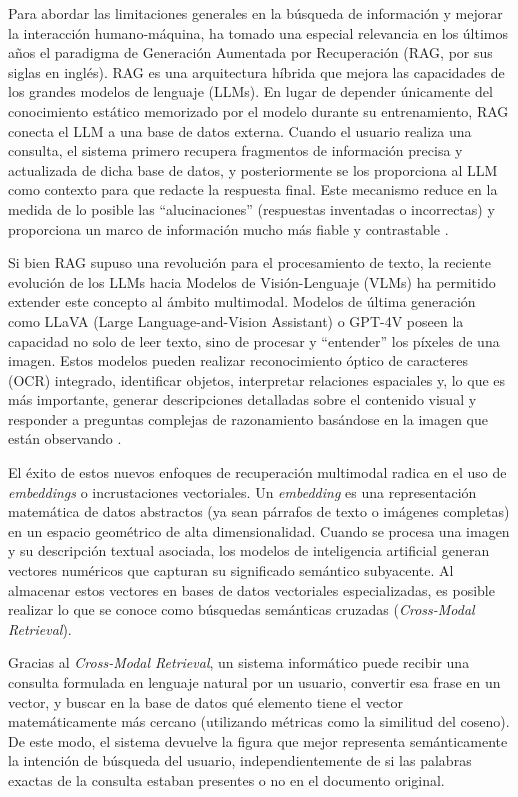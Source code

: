 \documentclass[a4paper]{report}
\begin{document}
Para abordar las limitaciones generales en la búsqueda de información y mejorar la interacción humano-máquina, ha tomado una especial relevancia en los últimos años el paradigma de Generación Aumentada por Recuperación (RAG, por sus siglas en inglés). RAG es una arquitectura híbrida que mejora las capacidades de los grandes modelos de lenguaje (LLMs). En lugar de depender únicamente del conocimiento estático memorizado por el modelo durante su entrenamiento, RAG conecta el LLM a una base de datos externa. Cuando el usuario realiza una consulta, el sistema primero recupera fragmentos de información precisa y actualizada de dicha base de datos, y posteriormente se los proporciona al LLM como contexto para que redacte la respuesta final. Este mecanismo reduce en la medida de lo posible las ``alucinaciones'' (respuestas inventadas o incorrectas) y proporciona un marco de información mucho más fiable y contrastable \cite{lewis2020}.

Si bien RAG supuso una revolución para el procesamiento de texto, la reciente evolución de los LLMs hacia Modelos de Visión-Lenguaje (VLMs) ha permitido extender este concepto al ámbito multimodal. Modelos de última generación como LLaVA (Large Language-and-Vision Assistant) o GPT-4V poseen la capacidad no solo de leer texto, sino de procesar y ``entender'' los píxeles de una imagen. Estos modelos pueden realizar reconocimiento óptico de caracteres (OCR) integrado, identificar objetos, interpretar relaciones espaciales y, lo que es más importante, generar descripciones detalladas sobre el contenido visual y responder a preguntas complejas de razonamiento basándose en la imagen que están observando \cite{liu2024}.

El éxito de estos nuevos enfoques de recuperación multimodal radica en el uso de \textit{embeddings} o incrustaciones vectoriales. Un \textit{embedding} es una representación matemática de datos abstractos (ya sean párrafos de texto o imágenes completas) en un espacio geométrico de alta dimensionalidad. Cuando se procesa una imagen y su descripción textual asociada, los modelos de inteligencia artificial generan vectores numéricos que capturan su significado semántico subyacente. Al almacenar estos vectores en bases de datos vectoriales especializadas, es posible realizar lo que se conoce como búsquedas semánticas cruzadas (\textit{Cross-Modal Retrieval}). 

Gracias al \textit{Cross-Modal Retrieval}, un sistema informático puede recibir una consulta formulada en lenguaje natural por un usuario, convertir esa frase en un vector, y buscar en la base de datos qué elemento tiene el vector matemáticamente más cercano (utilizando métricas como la similitud del coseno). De este modo, el sistema devuelve la figura que mejor representa semánticamente la intención de búsqueda del usuario, independientemente de si las palabras exactas de la consulta estaban presentes o no en el documento original.
\end{document}
